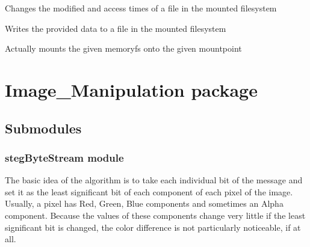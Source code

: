 \documentclass[letterpaper,10pt,english]{sphinxmanual}
\begin{document}
\begin{fulllineitems}
\begin{fulllineitems}
\end{fulllineitems}


\begin{fulllineitems}
\label{File_System:File_System.memfuse.MemFS.utimens}
Changes the modified and access times of a file in the mounted filesystem

\end{fulllineitems}


\begin{fulllineitems}
\label{File_System:File_System.memfuse.MemFS.write}
Writes the provided data to a file in the mounted filesystem

\end{fulllineitems}


\end{fulllineitems}


\begin{fulllineitems}
\label{File_System:File_System.memfuse.mount}
Actually mounts the given memoryfs onto the given mountpoint

\end{fulllineitems}



\section{Image\_Manipulation package}
\label{Image_Manipulation:image-manipulation-package}\label{Image_Manipulation::doc}

\subsection{Submodules}
\label{Image_Manipulation:submodules}

\subsubsection{stegByteStream module}
\label{Image_Manipulation:stegbytestream-module}
The basic idea of the algorithm is to take each individual bit of the message and set it as the least significant bit of each component of each pixel of the image. Usually, a pixel has Red, Green, Blue components and sometimes an Alpha component. Because the values of these components change very little if the least significant bit is changed, the color difference is not particularly noticeable, if at all.
\label{Image_Manipulation:module-Image_Manipulation.lsbsteg}
\end{document}
